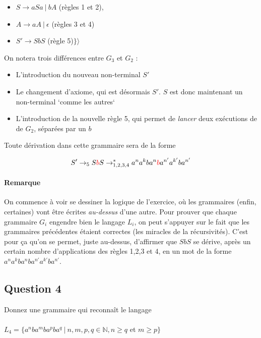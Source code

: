 \documentclass{article}[11pt]
\theoremstyle{definition}
\begin{document}
\begin{itemize}
\item[] $S \rightarrow aSa~|~bA$ (règles 1 et 2),
\item[] $A \rightarrow aA~|~\epsilon $ (règles 3 et 4)
\item[] $S' \rightarrow SbS$ (règle 5)$\}\big \rangle$ 
\end{itemize}

\noindent
On notera trois différences entre $G_3$ et $G_2$ : 

\begin{itemize}
\item[] L'introduction du nouveau non-terminal $S'$
\item[] Le changement d'axiome, qui est désormais $S'$. $S$ est donc maintenant un non-terminal `comme les autres`
\item[] L'introduction de la nouvelle règle 5, qui permet de \textit{lancer} deux exécutions de de $G_2$, séparées par un $b$
\end{itemize}


\noindent
Toute dérivation dans cette grammaire sera de la forme 

\[
S' \rightarrow_5 S\textcolor{red}{b}S \rightarrow_{1,2,3,4}^*  a^na^kba^n\textcolor{red}{b}a^{n'}a^{k'}ba^{n'}
\]

\paragraph*{Remarque} On commence à voir se dessiner la logique de l'exercice, où les grammaires (enfin, certaines) vont être écrites \textit{au-dessus} d'une autre. Pour prouver que chaque grammaire $G_i$ engendre bien le langage $L_i$, on peut s'appuyer sur le fait que les grammaires précédentes étaient correctes (les miracles de la récursivités). C'est pour ça qu'on se permet, juste au-dessus, d'affirmer que $SbS$ se dérive, après un certain nombre d'applications des règles 1,2,3 et 4, en un mot de la forme $a^na^kba^nba^{n'}a^{k'}ba^{n'}$.

\subsection*{Question 4}

Donnez une grammaire qui reconnaît le langage 

\paragraph*{}$L_4 = \{a^nba^mba^pba^q~|~n,m,p,q \in \mathbb{N}, n \geq q$ et $m \geq p\}$
\end{document}
